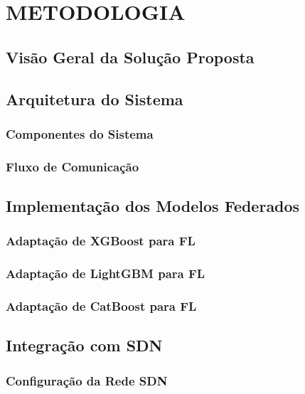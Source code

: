 \section{METODOLOGIA}

\subsection{Visão Geral da Solução Proposta}

\subsection{Arquitetura do Sistema}

\subsubsection{Componentes do Sistema}

\subsubsection{Fluxo de Comunicação}

\subsection{Implementação dos Modelos Federados}

\subsubsection{Adaptação de XGBoost para FL}

\subsubsection{Adaptação de LightGBM para FL}

\subsubsection{Adaptação de CatBoost para FL}

\subsection{Integração com SDN}

\subsubsection{Configuração da Rede SDN}

